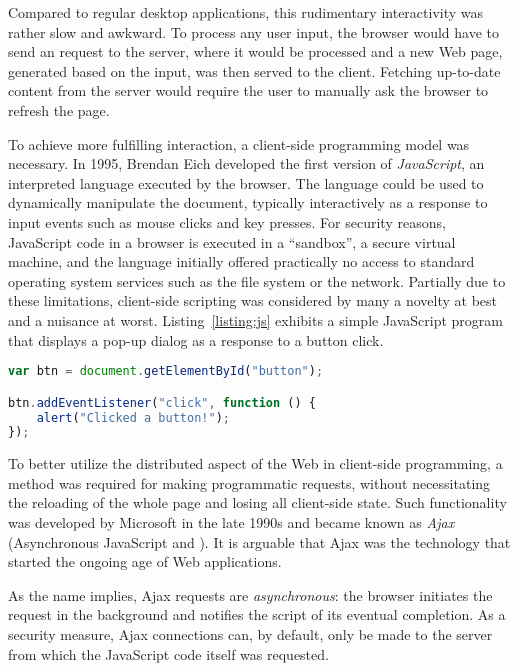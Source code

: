 Compared to regular desktop applications, this rudimentary interactivity was rather slow and awkward. To process any user input, the browser would have to send an  request to the server, where it would be processed and a new Web page, generated based on the input, was then served to the client. Fetching up-to-date content from the server would require the user to manually ask the browser to refresh the page.

To achieve more fulfilling interaction, a client-side programming model was necessary. In \num{1995}, Brendan Eich developed the first version of \emph{JavaScript}, an interpreted language executed by the browser. The language could be used to dynamically manipulate the document, typically interactively as a response to input events such as mouse clicks and key presses. For security reasons, JavaScript code in a browser is executed in a ``sandbox'', a secure virtual machine, and the language initially offered practically no access to standard operating system services such as the file system or the network. Partially due to these limitations, client-side scripting was considered by many a novelty at best and a nuisance at worst. Listing~\ref{listing:js} exhibits a simple JavaScript program that displays a pop-up dialog as a response to a button click.


\begin{code}
\begin{lstlisting}[language=JavaScript,caption=A small JavaScript program.\label{listing:js}]
var btn = document.getElementById("button");

btn.addEventListener("click", function () {
    alert("Clicked a button!");
});
\end{lstlisting}
\end{code}

To better utilize the distributed aspect of the Web in client-side programming, a method was required for making programmatic  requests, without necessitating the reloading of the whole page and losing all client-side state. Such functionality was developed by Microsoft in the late \num{1990s} and became known as \emph{Ajax} (Asynchronous JavaScript and ). It is arguable that Ajax was the technology that started the ongoing age of Web applications.

As the name implies, Ajax requests are \emph{asynchronous}: the browser initiates the request in the background and notifies the script of its eventual completion. As a security measure, Ajax connections can, by default, only be made to the server from which the JavaScript code itself was requested.

